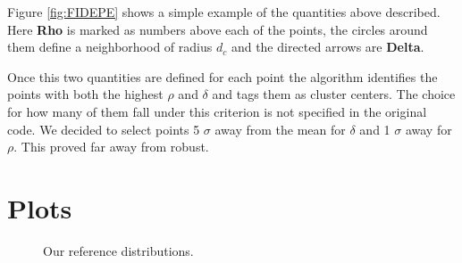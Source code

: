 \documentclass[12pt]{article}
\begin{document}
Figure \ref{fig:FIDEPE} shows a simple example of the quantities above described. Here \textbf{Rho} is marked as numbers above each of the points, the circles around them define a neighborhood of radius $d_c$ and the directed arrows are \textbf{Delta}.


Once this two quantities are defined for each point the algorithm identifies the points with both the highest \textbf{$\rho$} and \textbf{$\delta$} and tags them as cluster centers. The choice for how many of them fall under this criterion is not specified in the original code. We decided to select points 5 $\sigma$ away from the mean for \textbf{$\delta$} and 1 $\sigma$ away for \textbf{$\rho$}. This proved far away from robust.

\section{Plots}

\begin{figure}[ht]
\centering
\caption{Our reference distributions.}
\label{fig:reference}
\end{figure}
\end{document}
